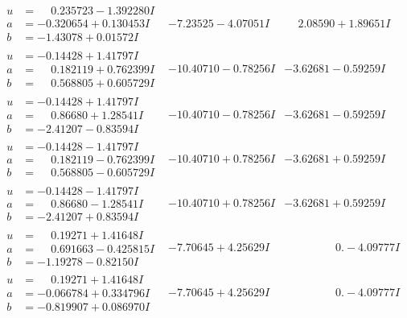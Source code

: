 \documentclass[1p]{elsarticle_modified}
\theoremstyle{definition}
\begin{document}
$$\begin{array}{c|c|c}
\begin{aligned}
u &= \phantom{-}0.235723 - 1.392280 I \\
a &= -0.320654 + 0.130453 I \\
b &= -1.43078 + 0.01572 I\end{aligned}
 & -7.23525 - 4.07051 I & \phantom{-}2.08590 + 1.89651 I \\ \hline\begin{aligned}
u &= -0.14428 + 1.41797 I \\
a &= \phantom{-}0.182119 + 0.762399 I \\
b &= \phantom{-}0.568805 + 0.605729 I\end{aligned}
 & -10.40710 - 0.78256 I & -3.62681 - 0.59259 I \\ \hline\begin{aligned}
u &= -0.14428 + 1.41797 I \\
a &= \phantom{-}0.86680 + 1.28541 I \\
b &= -2.41207 - 0.83594 I\end{aligned}
 & -10.40710 - 0.78256 I & -3.62681 - 0.59259 I \\ \hline\begin{aligned}
u &= -0.14428 - 1.41797 I \\
a &= \phantom{-}0.182119 - 0.762399 I \\
b &= \phantom{-}0.568805 - 0.605729 I\end{aligned}
 & -10.40710 + 0.78256 I & -3.62681 + 0.59259 I \\ \hline\begin{aligned}
u &= -0.14428 - 1.41797 I \\
a &= \phantom{-}0.86680 - 1.28541 I \\
b &= -2.41207 + 0.83594 I\end{aligned}
 & -10.40710 + 0.78256 I & -3.62681 + 0.59259 I \\ \hline\begin{aligned}
u &= \phantom{-}0.19271 + 1.41648 I \\
a &= \phantom{-}0.691663 - 0.425815 I \\
b &= -1.19278 - 0.82150 I\end{aligned}
 & -7.70645 + 4.25629 I & \phantom{-0.000000 } 0. - 4.09777 I \\ \hline\begin{aligned}
u &= \phantom{-}0.19271 + 1.41648 I \\
a &= -0.066784 + 0.334796 I \\
b &= -0.819907 + 0.086970 I\end{aligned}
 & -7.70645 + 4.25629 I & \phantom{-0.000000 } 0. - 4.09777 I\\

\end{array}$$
\end{document}
